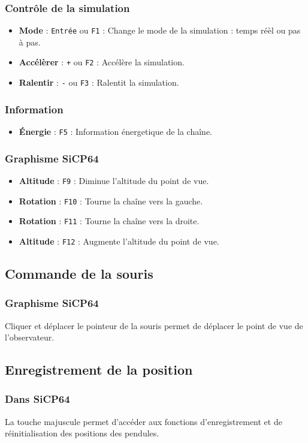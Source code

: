 \subsubsection{Contrôle de la simulation}
%
\begin{itemize}[label=, leftmargin=2cm]
\item {\bf Mode} : \texttt{Entrée} ou \texttt{F1} : Change le mode de la simulation : temps réèl ou pas à pas.
\item {\bf Accélèrer} : \texttt{+} ou \texttt{F2} : Accélère la simulation.
\item {\bf Ralentir} : \texttt{-} ou \texttt{F3} : Ralentit la simulation.
\end{itemize}
%
\subsubsection{Information}
\begin{itemize}[label=, leftmargin=2cm]
\item {\bf Énergie} : \texttt{F5} : Information énergetique de la chaîne.
\end{itemize}
%
\subsubsection{Graphisme SiCP64}
%
\begin{itemize}[label=, leftmargin=2cm]
\item {\bf Altitude} : \texttt{F9} : Diminue l'altitude du point de vue.
\item {\bf Rotation} : \texttt{F10} : Tourne la chaîne vers la gauche.
\item {\bf Rotation} : \texttt{F11} : Tourne la chaîne vers la droite.
\item {\bf Altitude} : \texttt{F12} : Augmente l'altitude du point de vue.
\end{itemize}
%
\subsection{Commande de la souris}
%
\subsubsection{Graphisme SiCP64}
%
Cliquer et déplacer le pointeur de la souris permet de déplacer le point de vue de l'observateur.
\subsection{Enregistrement de la position}

\subsubsection{Dans SiCP64}
%
La touche majuscule permet d'accéder aux fonctions d'enregistrement et de réinitialisation des positions des pendules.
